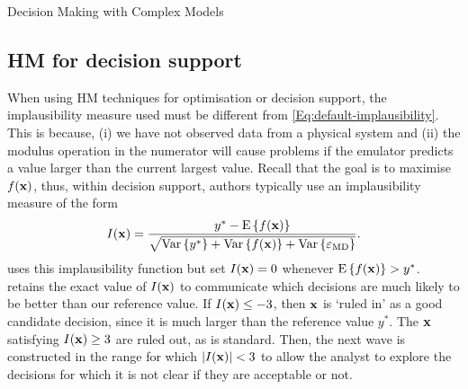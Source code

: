 \begin{chapter}{Decision Making with Complex Models \label{Chap:optimisation}}

\subsection{HM for decision support}
When using HM techniques for optimisation or decision support, the implausibility measure used must be different from \cref{Eq:default-implausibility}. This is because, (i) we have not observed data from a physical system and (ii) the modulus operation in the numerator will cause problems if the emulator predicts a value larger than the current largest value. Recall that the goal is to maximise $f(\mathbf{x})$, thus, within decision support, authors typically use an implausibility measure of the form
\begin{equation}
 I(\mathbf{x}) = \frac{y^* - \textrm{E}\, \{f(\mathbf{x})\} }{\sqrt{ \mathrm{Var}\,\{y^*\} + \mathrm{Var}\,\{f(\mathbf{x})\} + \mathrm{Var}\,\{\varepsilon_{\text{MD}}\}}}.
\end{equation}
\citet{Owen2020} uses this implausibility function but set $I(\mathbf{x}) = 0$ whenever $\textrm{E}\,\{ f(\mathbf{x}) \} > y^{*} $. \citet{Baker2020c} retains the exact value of $I(\mathbf{x})$ to communicate which decisions are much likely to be better than our reference value. If $I(\mathbf{x}) \leq -3$, then $\mathbf{x}$ is `ruled in' as a good candidate decision, since it is much larger than the reference value $y^{*}$. The $\mathbf{x}$ satisfying $I(\mathbf{x}) \geq 3$ are ruled out, as is standard. Then, the next wave is constructed in the range for which $|I(\mathbf{x})| < 3$ to allow the analyst to explore the decisions for which it is not clear if they are acceptable or not.
\begin{figure}
 \centering

\end{figure}
\end{chapter}
